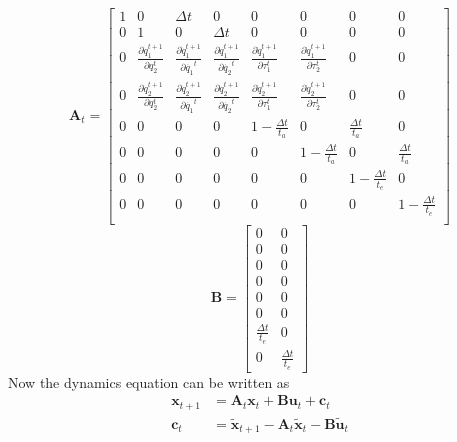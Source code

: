 \begin{equation}
\bm{A}_t = \left[\begin{matrix}
1 & 0 & \Delta t & 0  & 0 & 0 & 0 & 0 \\
0 & 1 & 0 &\Delta t   & 0 & 0 & 0 & 0 \\
0 & \frac{\partial{\dot{q}_1^{t+1}}}{\partial{q_2^t}} & \frac{\partial{\dot{q}_1^{t+1}}}{\partial{\dot{q_1}^t}} & \frac{\partial{\dot{q}_1^{t+1}}}{\partial{\dot{q_2}^t}} & \frac{\partial{\dot{q}_1^{t+1}}}{\partial{\tau_1^t}} & \frac{\partial{\dot{q}_1^{t+1}}}{\partial{\tau_2^t}}& 0& 0 \\
0 & \frac{\partial{\dot{q}_2^{t+1}}}{\partial{q_2^t}} & \frac{\partial{\dot{q}_2^{t+1}}}{\partial{\dot{q_1}^t}} & \frac{\partial{\dot{q}_2^{t+1}}}{\partial{\dot{q_2}^t}} & \frac{\partial{\dot{q}_2^{t+1}}}{\partial{\tau_1^t}} & \frac{\partial{\dot{q}_2^{t+1}}}{\partial{\tau_2^t}}& 0& 0 \\
0 & 0 & 0 & 0   &   1-\frac{\Delta t}{t_a} & 0 & \frac{\Delta t}{t_a} & 0 \\
0 & 0 & 0 & 0   &   0 & 1-\frac{\Delta t}{t_a} & 0 & \frac{\Delta t}{t_a} \\
0 & 0 & 0 & 0   &   0 & 0 & 1-\frac{\Delta t}{t_e} & 0 \\
0 & 0 & 0 & 0   &   0 & 0 & 0 & 1-\frac{\Delta t}{t_e} \\
\end{matrix}\right]
\end{equation}
\begin{equation}
\bm{B} = \left[\begin{matrix}
0 & 0 \\
0 & 0 \\
0 & 0 \\
0 & 0 \\
0 & 0 \\
0 & 0 \\
\frac{\Delta t}{t_e} & 0 \\
0 & \frac{\Delta t}{t_e} 
\end{matrix}\right]
\end{equation}
Now the dynamics equation can be written as
\begin{equation}\label{dynam}
\begin{split}
\bm{x}_{t+1} &= \bm{A}_t \bm{x}_t + \bm{B}\bm{u}_t + \bm{c}_t \\
\bm{c}_t &= \tilde{\bm{x}}_{t+1} - \bm{A}_t\tilde{\bm{x}}_{t} - \bm{B}\tilde{\bm{u}}_t
\end{split}
\end{equation}

